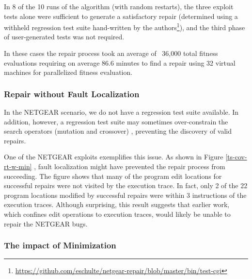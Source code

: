 \documentclass{sigcomm-alternate}
\begin{document}
In 8 of the 10 runs of the algorithm (with random restarts), the three
exploit tests alone were sufficient to generate a satisfactory repair
(determined using a withheld regression test suite hand-written by the
authors\footnote{\url{https://github.com/eschulte/netgear-repair/blob/master/bin/test-cgi}}),
and the third phase of user-generated tests was not required.

In these cases the repair process took an average of ~36,000 total fitness
evaluations requiring on average 86.6 minutes to find a repair using 32
virtual machines for parallelized fitness evaluation.

\subsubsection{Repair without Fault Localization}
\label{no-fault-localization}

In the NETGEAR scenario, we do not have a regression test suite available.
In addition, however, a regression test suite may sometimes
over-constrain the search operators (mutation and crossover)
\cite{schulte2013optimization}, preventing the discovery of valid
repairs.

One of the NETGEAR exploits exemplifies this issue.  As shown in
Figure \ref{ts-cov-rt-w-min} , fault localization might have prevented
the repair process from succeeding.  The figure shows that many of the
program edit locations for successful repairs were not visited by the
execution trace.  In fact, only 2 of the 22 program locations modified
by successful repairs were within 3 instructions of the execution
traces.  Although surprising, this result suggests that earlier work,
which confines edit operations to execution traces, would likely be
unable to repair the NETGEAR bugs.

\subsubsection{The impact of Minimization}
\label{minimization}
\end{document}
